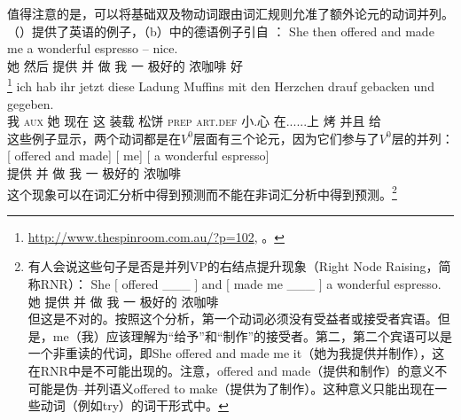 \noindent
    值得注意的是，可以将基础双及物动词跟由词汇规则允准了额外论元的动词并列。（）提供了英语的例子，（b）中的德语例子引自 ：
\eal
\label{promise-make}
\ex 
\gll She then offered and made me a wonderful espresso -- nice.\\
     她  然后 提供 并 做 我 一 极好的 浓咖啡 {} 好\\
\footnote{%
\url{http://www.thespinroom.com.au/?p=102}, 。
}
\ex 
\label{ex-gebacken-und-gegeben}
\gll ich hab ihr jetzt diese Ladung Muffins mit den Herzchen drauf gebacken und gegeben.\footnotemark\\
     我 \textsc{aux} 她 现在 这 装载 松饼 \textsc{prep} \textsc{art}.\textsc{def} 小.心 在......上 烤 并且 给\\
\zl
\noindent
这些例子显示，两个动词都是在$V^0$层面有三个论元，因为它们参与了$V^0$层的并列：
\ea
\gll 
{}[\sub{\vnull} offered and made] [ me]    [ a wonderful espresso] \\
{}\spacebr{} 提供 并 做 \spacebr{} 我 \spacebr{} 一 极好的 浓咖啡\\
\z
这个现象可以在词汇分析中得到预测而不能在非词汇分析中得到预测。\footnote{%
有人会说这些句子是否是并列VP的右结点提升现象（Right Node Raising，简称RNR）\citep{Bresnan74a-u, Abbott76a-u}： 
\ea \label{rnr}
\gll
She $[$ offered  \_\_\_  $]$ and $[$ made me \_\_\_ $]$  a wonderful espresso. \\
她 \spacebr{} 提供 {} \spacebr{} 并 \spacebr{} 做 我 {} \spacebr{} 一 极好的 浓咖啡\\
\z
但这是不对的。按照这个分析，第一个动词必须没有受益者或接受者宾语。但是，me（我）应该理解为“给予”和“制作”的接受者。第二，第二个宾语可以是一个非重读的代词，即She offered and made me it（她为我提供并制作），这在RNR中是不可能出现的。注意，offered and made（提供和制作）的意义不可能是伪--并列语义offered to make（提供为了制作）。这种意义只能出现在一些动词（例如try）的词干形式中。
}  

